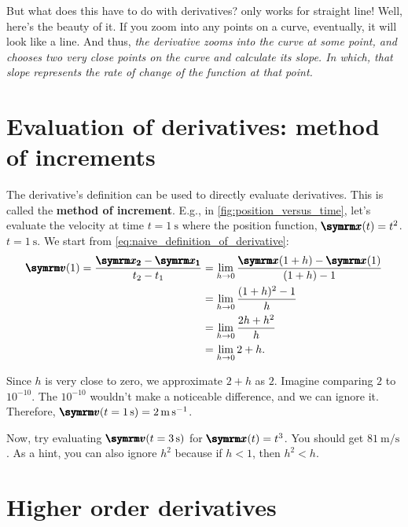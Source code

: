 But what does this have to do with derivatives?  only works for straight line! Well, here's the beauty of it. If you zoom into any points on a curve, eventually, it will look like a line. And thus, \emph{the derivative zooms into the curve at some point, and chooses two very close points on the curve and calculate its slope. In which, that slope represents the rate of change of the function at that point.}

\section{Evaluation of derivatives: method of increments}

The derivative's definition can be used to directly evaluate derivatives. This is called the \textbf{method of increment}. E.g., in \cref{fig:position_versus_time}, let's evaluate the velocity at time $t = \qty{1}{\second}$ where the position function, $\vv{x}(t) = t^2$. $t = \qty{1}{\second}$. We start from \cref{eq:naive_definition_of_derivative}:
\begin{align*}
    \vv{v}(1) = \frac{\vv{x_2} - \vv{x_1}}{t_2 - t_1} &= \lim_{h \appr 0}\frac{\vv{x}(1 + h) - \vv{x}(1)}{(1 + h) - 1} \\
    &= \lim_{h \appr 0}\frac{(1 + h)^2 - 1}{h} \\
    &= \lim_{h \appr 0}\frac{2h + h^2}{h} \\
    &= \lim_{h \appr 0}2 + h.
\end{align*}

Since $h$ is very close to zero, we approximate $2 + h$ as $2$. Imagine comparing $2$ to $10^{-10}$. The $10^{-10}$ wouldn't make a noticeable difference, and we can ignore it. Therefore, $\vv{v}(t = \qty{1}{\second}) = \qty{2}{\meter\per\second}$.

Now, try evaluating $\vv{v}(t = \qty{3}{\second})$ for $\vv{x}(t) = t^3$. You should get $\qty{81}{\meter\per\second}$. As a hint, you can also ignore $h^2$ because if $h < 1$, then $h^2 < h$.

\section{Higher order derivatives}

